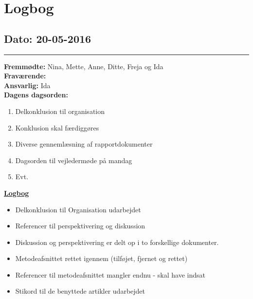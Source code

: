 \chapter{Logbog}
\section{Dato: 20-05-2016}
\hrule
\textbf{Fremmødte: } Nina, Mette, Anne, Ditte, Freja og Ida \\
\textbf{Fraværende: } \\
\textbf{Ansvarlig:} Ida  \\
\textbf{Dagens dagsorden: }
\begin{enumerate}
\item Delkonklusion til organisation
\item Konklusion skal færdiggøres
\item Diverse gennemlæsning af rapportdokumenter
\item Dagsorden til vejledermøde på mandag
\item Evt.
\end{enumerate}

\underline{\textbf{Logbog}}
\begin{itemize}
\item Delkonklusion til Organisation udarbejdet
\item Referencer til perspektivering og diskussion
\item Diskussion og perspektivering er delt op i to forskellige dokumenter.
\item Metodeafsnittet rettet igennem (tilføjet, fjernet og rettet)
\item Referencer til metodeafsnittet mangler endnu - skal have indsat
\item Stikord til de benyttede artikler udarbejdet
\end{itemize}
\newpage